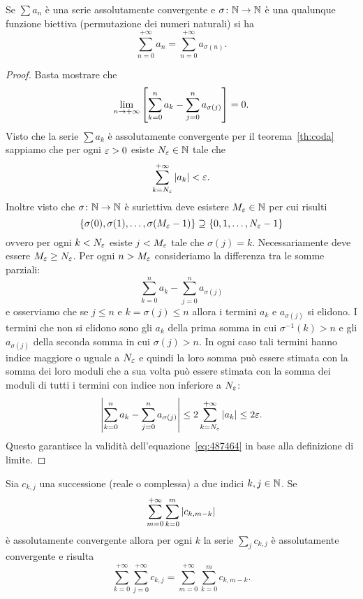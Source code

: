 \begin{theorem}%
\label{th:convergenza_incondizionata}%
\mymark{*}%
%
Se $\sum a_n$ è una serie assolutamente convergente e $\sigma\colon \mathbb N \to \mathbb N$
è una qualunque funzione biettiva (permutazione dei numeri naturali)
si ha
\[
  \sum_{n=0}^{+\infty} a_n = \sum_{n=0}^{+\infty} a_{\sigma(n)}.
\]
\end{theorem}
%
\begin{proof}
Basta mostrare che
\begin{equation}
\label{eq:487464}
\lim_{n\to +\infty} {\left[ \sum_{k=0}^n a_k
 - \sum_{j=0}^n a_{\sigma(j)} \right]} = 0.
\end{equation}
Visto che la serie $\sum a_k$ è assolutamente convergente
per il teorema~\ref{th:coda} sappiamo
che per ogni $\varepsilon>0$ esiste $N_\varepsilon\in \mathbb N$ tale che
\[
  \sum_{k=N_\varepsilon}^{+\infty} {\left|a_k\right|} < \varepsilon.
\]
Inoltre visto che $\sigma\colon \mathbb N \to \mathbb N$ è suriettiva
deve esistere $M_\varepsilon \in \mathbb N$ per cui risulti
\[
 {\left\{ \sigma(0), \sigma(1), \dots, \sigma(M_\varepsilon-1) \right\}}
 \supseteq {\left\{ 0,1,\dots, N_\varepsilon- 1 \right\}}
\]
ovvero per ogni $k<N_\varepsilon$ esiste $j<M_\varepsilon$ tale
che $\sigma(j)=k$.
Necessariamente deve essere $M_\varepsilon\ge N_\varepsilon$.
Per ogni $n>M_\varepsilon$ consideriamo
la differenza tra le somme parziali:
\[
\sum_{k=0}^n a_k - \sum_{j=0}^n a_{\sigma(j)}
\]
e osserviamo che se $j\le n$ e $k=\sigma(j)\le n$ allora
i termini $a_k$ e $a_{\sigma(j)}$ si elidono.
I termini che non si elidono sono gli $a_k$ della prima somma
in cui $\sigma^{-1}(k)>n$ e gli $a_{\sigma(j)}$
della seconda somma in cui $\sigma(j)>n$.
In ogni caso tali termini hanno indice maggiore
o uguale a $N_\varepsilon$ e quindi la loro somma
può essere stimata con la somma dei loro moduli
che a sua volta può essere stimata con la somma
dei moduli di tutti i termini con indice
non inferiore a $N_\varepsilon$:
\begin{align*}
  {\left|\sum_{k=0}^n a_k - \sum_{j=0}^n a_{\sigma(j)}\right|}
  \le 2 \sum_{k=N_\varepsilon}^{+\infty} {\left|a_k\right|} \le 2\varepsilon.
\end{align*}
Questo garantisce la validità dell'equazione~\eqref{eq:487464} in base
alla definizione di limite.
\end{proof}

\begin{theorem}%
\label{th:somma_Cauchy}%
Sia $c_{k,j}$ una successione (reale o complessa)
a due indici $k,j\in \mathbb N$.
Se
\[
  \sum_{m=0}^{+\infty} \sum_{k=0}^m {\left|c_{k,m-k}\right|}
\]
è assolutamente convergente
allora per ogni $k$ la serie $\sum_j c_{k,j}$ è
assolutamente convergente e risulta
\[
  \sum_{k=0}^{+\infty} \sum_{j=0}^{+\infty} c_{k,j}
  = \sum_{m=0}^{+\infty} \sum_{k=0}^m c_{k,m-k}.
\]
\end{theorem}

